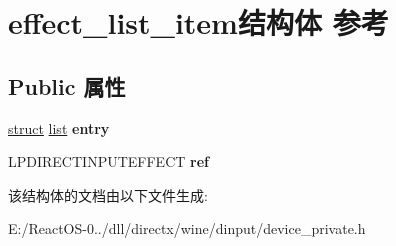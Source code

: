 \hypertarget{structeffect__list__item}{}\section{effect\+\_\+list\+\_\+item结构体 参考}
\label{structeffect__list__item}
\subsection*{Public 属性}
\begin{DoxyCompactItemize}
\item 
\mbox{\label{structeffect__list__item_a25267689b97e9856c879ee76d1422c90}} 
\hyperlink{interfacestruct}{struct} \hyperlink{classlist}{list} {\bfseries entry}
\item 
\mbox{\label{structeffect__list__item_ac8389d2171dd3f0ec79959f4390aba58}} 
L\+P\+D\+I\+R\+E\+C\+T\+I\+N\+P\+U\+T\+E\+F\+F\+E\+CT {\bfseries ref}
\end{DoxyCompactItemize}


该结构体的文档由以下文件生成\+:\begin{DoxyCompactItemize}
\item 
E\+:/\+React\+O\+S-\/0../dll/directx/wine/dinput/device\+\_\+private.\+h\end{DoxyCompactItemize}
